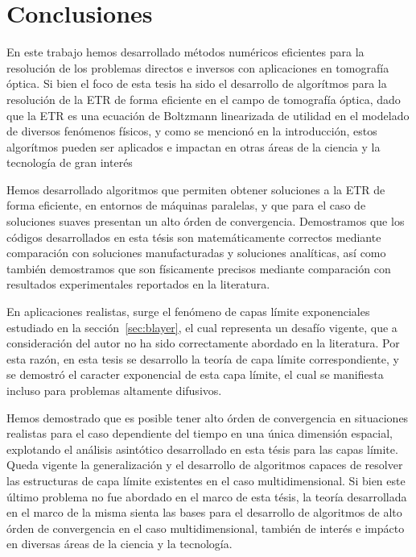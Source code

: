 \pagestyle{fancy}
\chapter{Conclusiones}
\lhead{\thepage}
\vspace{0.01\textheight}
\pagebreak
En este trabajo hemos desarrollado métodos numéricos eficientes 
para la resolución de los problemas directos e inversos con 
aplicaciones en tomografía óptica. 
Si bien el foco de esta tesis ha sido el desarrollo de algorítmos 
para la resolución de la ETR de forma eficiente en el campo 
de tomografía óptica, 
dado que la ETR es una ecuación de Boltzmann 
linearizada de utilidad en el modelado de diversos 
fenómenos físicos, y como se mencionó en la introducción, estos algorítmos pueden ser aplicados e impactan 
en otras áreas de la ciencia y la tecnología de gran interés~\cite{Howell2010, Thynell1998,Duderstadt1979,Qin2015,Dymond1997,Chandrasekhar1960,Zhu2005,Zhu2010,Vassiliev2010,Bedford2019,Vassiliev2010,Bedford2019,Larsen2006, Sanchez1982, Anli2006,Mishchenko1999, Prasher2003}

 Hemos desarrollado algoritmos que permiten obtener soluciones 
 a la ETR de forma eficiente, en entornos de máquinas paralelas, 
 y que para el caso de soluciones suaves presentan un alto órden de convergencia. 
 Demostramos que los códigos desarrollados en esta tésis son matemáticamente 
 correctos mediante comparación con soluciones manufacturadas y soluciones 
 analíticas, así como también demostramos que son físicamente 
 precisos mediante comparación con resultados experimentales 
 reportados en la literatura.
 
 En aplicaciones realistas, surge el fenómeno de capas límite exponenciales 
 estudiado en la sección~\ref{sec:blayer}, el cual representa un desafío 
 vigente, que a consideración del autor no ha sido correctamente 
 abordado en la literatura. Por esta razón, en esta tesis 
 se desarrollo la teoría de capa límite correspondiente, y se demostró 
 el caracter exponencial de esta capa límite, el cual se manifiesta 
 incluso para problemas altamente difusivos.
 
 Hemos demostrado que es posible 
 tener alto órden de convergencia en situaciones realistas para 
 el caso dependiente del tiempo en una única dimensión espacial, 
 explotando el análisis asintótico desarrollado en esta tésis para las capas límite. 
 Queda vigente la generalización y el desarrollo de algoritmos capaces 
 de resolver las estructuras de capa límite existentes en el caso 
 multidimensional. Si bien este último problema no fue abordado en el marco de esta tésis, 
 la teoría desarrollada en el marco de la misma sienta las bases 
 para el desarrollo de algoritmos de alto órden de convergencia en el 
 caso multidimensional, también de interés e impácto en diversas 
 áreas de la ciencia y la tecnología. 
 
